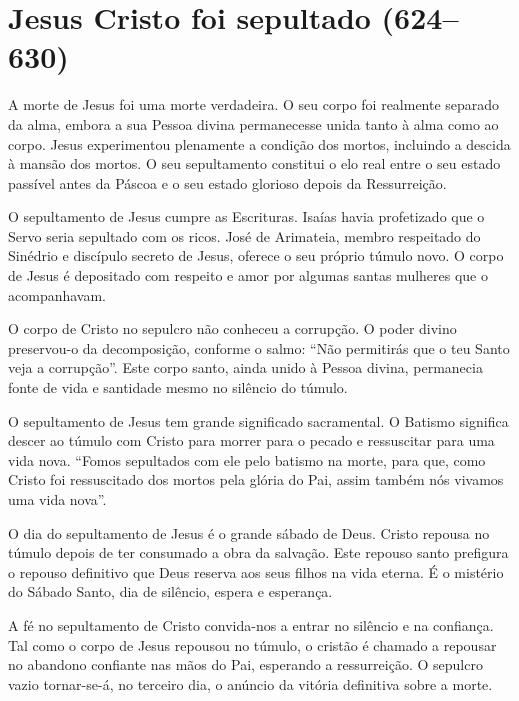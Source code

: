 \section{Jesus Cristo foi sepultado (624--630)}

A morte de Jesus foi uma morte verdadeira. O seu corpo foi realmente separado da alma, embora a sua Pessoa divina permanecesse unida tanto à alma como ao corpo. Jesus experimentou plenamente a condição dos mortos, incluindo a descida à mansão dos mortos. O seu sepultamento constitui o elo real entre o seu estado passível antes da Páscoa e o seu estado glorioso depois da Ressurreição.

O sepultamento de Jesus cumpre as Escrituras. Isaías havia profetizado que o Servo seria sepultado com os ricos. José de Arimateia, membro respeitado do Sinédrio e discípulo secreto de Jesus, oferece o seu próprio túmulo novo. O corpo de Jesus é depositado com respeito e amor por algumas santas mulheres que o acompanhavam.

O corpo de Cristo no sepulcro não conheceu a corrupção. O poder divino preservou-o da decomposição, conforme o salmo: ``Não permitirás que o teu Santo veja a corrupção''. Este corpo santo, ainda unido à Pessoa divina, permanecia fonte de vida e santidade mesmo no silêncio do túmulo.

O sepultamento de Jesus tem grande significado sacramental. O Batismo significa descer ao túmulo com Cristo para morrer para o pecado e ressuscitar para uma vida nova. ``Fomos sepultados com ele pelo batismo na morte, para que, como Cristo foi ressuscitado dos mortos pela glória do Pai, assim também nós vivamos uma vida nova''.

O dia do sepultamento de Jesus é o grande sábado de Deus. Cristo repousa no túmulo depois de ter consumado a obra da salvação. Este repouso santo prefigura o repouso definitivo que Deus reserva aos seus filhos na vida eterna. É o mistério do Sábado Santo, dia de silêncio, espera e esperança.

A fé no sepultamento de Cristo convida-nos a entrar no silêncio e na confiança. Tal como o corpo de Jesus repousou no túmulo, o cristão é chamado a repousar no abandono confiante nas mãos do Pai, esperando a ressurreição. O sepulcro vazio tornar-se-á, no terceiro dia, o anúncio da vitória definitiva sobre a morte.